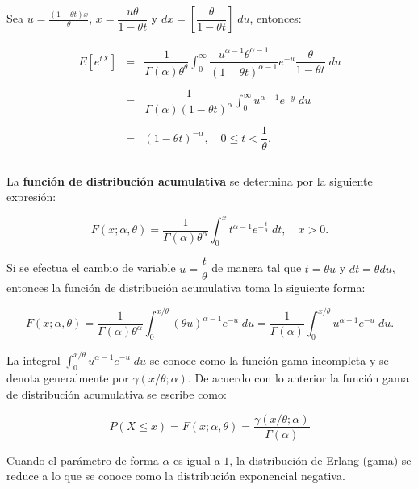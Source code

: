 Sea $u=\frac{(1-\theta t)x}{\theta}$, $x=\dfrac{u\theta}{1-\theta t}$ y $dx=\left[\dfrac{\theta}{1-\theta t}\right]\; du$, entonces:

$$\begin{array}{rcl}
    E\left[e^{tX}\right] &=& \dfrac{1}{\Gamma(\alpha)\theta^{\theta}}\displaystyle\int_0^\infty \dfrac{u^{\alpha-1}\theta^{\alpha-1}}{(1-\theta t)^{\alpha-1}}e^{-u}\dfrac{\theta}{1-\theta t}\; du\\\\
			 &=&\dfrac{1}{\Gamma(\alpha)(1-\theta t)^{\alpha}}\displaystyle\int_{0}^{\infty}u^{\alpha-1}e^{-y}\; du\\\\
			 &=&(1-\theta t)^{-\alpha},\quad 0\leq t < \dfrac{1}{\theta}.\\\\
\end{array}$$

La \textbf{función de distribución acumulativa} se determina por la siguiente expresión:

\begin{tcolorbox}
    $$F(x;\alpha,\theta) = \dfrac{1}{\Gamma(\alpha)\theta^{\alpha}} \int_0^x t^{\alpha-1}e^{-\frac{t}{\theta}} \; dt,\quad x>0.$$
\end{tcolorbox}

Si se efectua el cambio de variable $u=\dfrac{t}{\theta}$ de manera tal que $t=\theta u$ y $dt=\theta du$, entonces la función de distribución acumulativa toma la siguiente forma:

\begin{tcolorbox}
    $$F(x;\alpha,\theta)=\dfrac{1}{\Gamma(\alpha)\theta^{\alpha}} \int_0^{x/\theta}(\theta u)^{\alpha-1}e^{-u}\; du=\dfrac{1}{\Gamma(\alpha)}\int_0^{x/\theta}u^{\alpha-1}e^{-u}\; du.$$
\end{tcolorbox}

La integral $\int_0^{x/\theta}u^{\alpha-1}e^{-u}\; du$ se conoce como la función gama incompleta y se denota generalmente por $\gamma(x/\theta;\alpha)$. De acuerdo con lo anterior la función gama de distribución acumulativa se escribe como:

\begin{tcolorbox}
    $$P(X\leq x)=F(x;\alpha,\theta)=\dfrac{\gamma(x/\theta;\alpha)}{\Gamma(\alpha)}$$
\end{tcolorbox}

Cuando el parámetro de forma $\alpha$ es igual a $1$, la distribución de Erlang (gama) se reduce a lo que se conoce como la distribución exponencial negativa.\\\\

